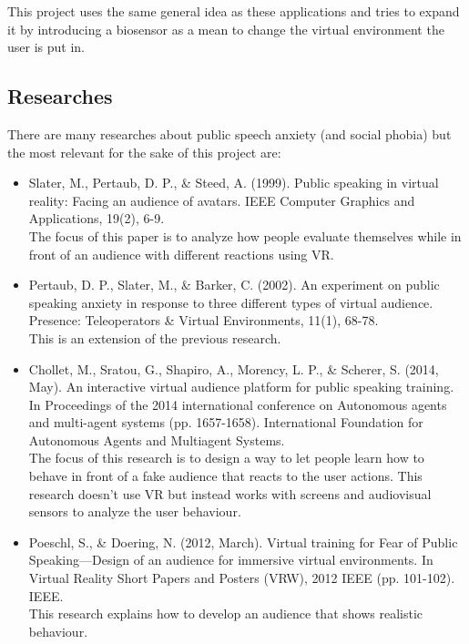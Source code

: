 This project uses the same general idea as these applications and tries to expand it by introducing a biosensor as a mean to change the virtual environment the user is put in. 

\subsection{Researches}
There are many researches about public speech anxiety (and social phobia) but the most relevant for the sake of this project are:

\begin{itemize}
	\item Slater, M., Pertaub, D. P., \& Steed, A. (1999). Public speaking in virtual reality: Facing an audience of avatars. IEEE Computer Graphics and Applications, 19(2), 6-9.\\[0.15cm]
	The focus of this paper is to analyze how people evaluate themselves while in front of an audience with different reactions using VR.
	
	\item Pertaub, D. P., Slater, M., \& Barker, C. (2002). An experiment on public speaking anxiety in response to three different types of virtual audience. Presence: Teleoperators \& Virtual Environments, 11(1), 68-78.\\[0.15cm]
	This is an extension of the previous research.
	
	\item Chollet, M., Sratou, G., Shapiro, A., Morency, L. P., \& Scherer, S. (2014, May). An interactive virtual audience platform for public speaking training. In Proceedings of the 2014 international conference on Autonomous agents and multi-agent systems (pp. 1657-1658). International Foundation for Autonomous Agents and Multiagent Systems.\\[0.15cm]
	The focus of this research is to design a way to let people learn how to behave in front of a fake audience that reacts to the user actions. This research doesn't use VR but instead works with screens and audiovisual sensors to analyze the user behaviour.
	
	\item Poeschl, S., \& Doering, N. (2012, March). Virtual training for Fear of Public Speaking—Design of an audience for immersive virtual environments. In Virtual Reality Short Papers and Posters (VRW), 2012 IEEE (pp. 101-102). IEEE.\\[0.15cm]
	This research explains how to develop an audience that shows realistic behaviour.
\end{itemize}